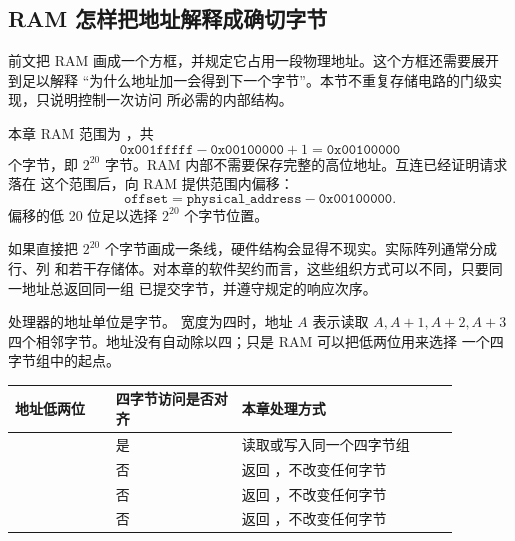 \subsection{RAM 怎样把地址解释成确切字节}

前文把 RAM 画成一个方框，并规定它占用一段物理地址。这个方框还需要展开到足以解释
“为什么地址加一会得到下一个字节”。本节不重复存储电路的门级实现，只说明控制一次访问
所必需的内部结构。


本章 RAM 范围为 ，共
\[
\texttt{0x001fffff}-\texttt{0x00100000}+1=\texttt{0x00100000}
\]
个字节，即 \(2^{20}\) 字节。RAM 内部不需要保存完整的高位地址。互连已经证明请求落在
这个范围后，向 RAM 提供范围内偏移：
\[
\texttt{offset}=\texttt{physical\_address}-\texttt{0x00100000}.
\]
偏移的低 20 位足以选择 \(2^{20}\) 个字节位置。

\begin{center}
\end{center}

如果直接把 \(2^{20}\) 个字节画成一条线，硬件结构会显得不现实。实际阵列通常分成行、列
和若干存储体。对本章的软件契约而言，这些组织方式可以不同，只要同一地址总返回同一组
已提交字节，并遵守规定的响应次序。


处理器的地址单位是字节。 宽度为四时，地址 \(A\) 表示读取
\(A,A+1,A+2,A+3\) 四个相邻字节。地址没有自动除以四；只是 RAM 可以把低两位用来选择
一个四字节组中的起点。

\begin{longtable}{|L{0.20\linewidth}|L{0.25\linewidth}|L{0.43\linewidth}|}
\hline
{}
地址低两位 & 四字节访问是否对齐 & 本章处理方式 \\ \hline
{} & 是 & 读取或写入同一个四字节组 \\ \hline
{} & 否 & 返回 ，不改变任何字节 \\ \hline
{} & 否 & 返回 ，不改变任何字节 \\ \hline
{} & 否 & 返回 ，不改变任何字节 \\ \hline
\end{longtable}

